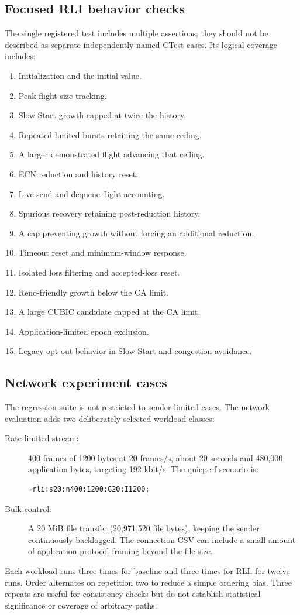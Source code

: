 \documentclass[11pt,a4paper]{article}
\newcommand{\code}[1]{\texttt{\detokenize{#1}}}
\begin{document}
\subsection{Focused RLI behavior checks}
The single registered \code{cubic_rli} test includes multiple assertions;
they should not be described as separate independently named CTest cases.
Its logical coverage includes:
\begin{enumerate}
\item Initialization and the initial \code{maxFS} value.
\item Peak flight-size tracking.
\item Slow Start growth capped at twice the history.
\item Repeated limited bursts retaining the same ceiling.
\item A larger demonstrated flight advancing that ceiling.
\item ECN reduction and history reset.
\item Live send and dequeue flight accounting.
\item Spurious recovery retaining post-reduction history.
\item A cap preventing growth without forcing an additional reduction.
\item Timeout reset and minimum-window response.
\item Isolated loss filtering and accepted-loss reset.
\item Reno-friendly growth below the CA limit.
\item A large CUBIC candidate capped at the CA limit.
\item Application-limited epoch exclusion.
\item Legacy opt-out behavior in Slow Start and congestion avoidance.
\end{enumerate}

\subsection{Network experiment cases}
The regression suite is not restricted to sender-limited cases. The
network evaluation adds two deliberately selected workload classes:
\begin{description}
\item[Rate-limited stream:] 400 frames of 1200 bytes at 20 frames/s,
about 20 seconds and 480,000 application bytes, targeting 192 kbit/s.
The quicperf scenario is:
\begin{lstlisting}
=rli:s20:n400:1200:G20:I1200;
\end{lstlisting}
\item[Bulk control:] A 20 MiB file transfer (20,971,520 file bytes),
keeping the sender continuously backlogged. The connection CSV can include
a small amount of application protocol framing beyond the file size.
\end{description}
Each workload runs three times for baseline and three times for RLI, for
twelve runs. Order alternates on repetition two to reduce a simple ordering
bias. Three repeats are useful for consistency checks but do not establish
statistical significance or coverage of arbitrary paths.
\end{document}
